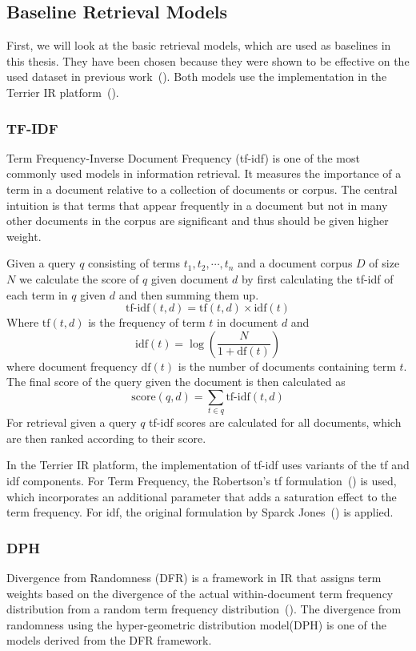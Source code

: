 \subsection{Baseline Retrieval Models}\label{sec:baseline-retrieval-models}
First, we will look at the basic retrieval models, which are used as baselines in this thesis.
They have been chosen because they were shown to be effective on the used dataset in previous work~(\cite{goeuriot:2021:Consumer}).
Both models use the implementation in the Terrier IR platform~(\cite{ounis:2005:Terrier}).

\subsubsection{TF-IDF}\label{sec:tf-idf}
Term Frequency-Inverse Document Frequency (tf-idf) is one of the most commonly used models in information retrieval.
It measures the importance of a term in a document relative to a collection of documents or corpus.
The central intuition is that terms that appear frequently in a document but not in many other documents in the corpus are significant and thus should be given higher weight.

Given a query \( q \) consisting of terms \( t_1,t_2,\cdots,t_n \) and a document corpus \( D \) of size \( N \) we calculate the score of \( q \) given document \( d \) by first calculating the tf-idf of each term  in \( q \) given \( d \) and then summing them up.
\[ \text{tf-idf}(t, d) = \text{tf}(t, d) \times \text{idf}(t) \]
Where \( \text{tf}(t, d) \) is the frequency of term \( t \) in document \( d \) and 
\[ \text{idf}(t) = \log \left( \frac{N}{1 + \text{df}(t)} \right) \]
where document frequency \( \text{df}(t) \) is the number of documents containing term \( t \).
The final score of the query given the document is then calculated as
\[ \text{score}(q, d) = \sum_{t \in q} \text{tf-idf}(t, d) \]
For retrieval given a query \( q \) tf-idf scores are calculated for all documents, which are then ranked according to their score.

In the Terrier IR platform, the implementation of tf-idf uses variants of the tf and idf components.
For Term Frequency, the Robertson's tf formulation~(\cite{robertson:2004:Understanding}) is used, which incorporates an additional parameter that adds a saturation effect to the term frequency.
For idf, the original formulation by Sparck Jones~(\cite{sparck:1972:A}) is applied.

\subsubsection{DPH}\label{sec:dph}
Divergence from Randomness (DFR) is a framework in IR that assigns term weights based on the divergence of the actual within-document term frequency distribution from a random term frequency distribution~(\cite{amati:2006:Frequentist}).
The divergence from randomness using the hyper-geometric distribution model(DPH) is one of the models derived from the DFR framework.

